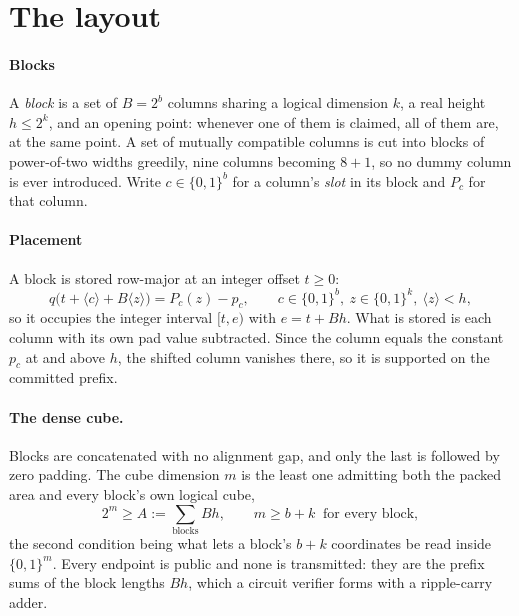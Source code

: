 \documentclass[11pt]{article}
\newcommand{\cube}[1]{\{0,1\}^{#1}}
\newcommand{\val}[1]{\langle #1 \rangle}
\theoremstyle{plain}
\begin{document}
\section{The layout}\label{sec:layout}

\paragraph{Blocks} A \emph{block} is a set of $B=2^b$ columns sharing a logical dimension $k$, a
real height $h\le2^k$, and an opening point: whenever one of them is claimed, all of them are,
at the same point. A set of mutually compatible columns is cut into blocks of power-of-two
widths greedily, nine columns becoming $8+1$, so no dummy column is ever introduced. Write
$c\in\cube b$ for a column's \emph{slot} in its block and $P_c$ for that column.

\paragraph{Placement} A block is stored row-major at an integer offset $t\ge0$:
\begin{equation}
  q\bigl(t+\val c+B\val z\bigr)=P_c(z)-p_c,\qquad c\in\cube b,\ z\in\cube k,\ \val z<h,
  \label{eq:place}
\end{equation}
so it occupies the integer interval $[t,e)$ with $e=t+Bh$. What is stored is each column with
its own pad value subtracted. Since the column equals the constant $p_c$ at and above $h$, the
shifted column vanishes there, so it is supported on the committed prefix.

\paragraph{The dense cube.} Blocks are concatenated with no alignment gap, and only the last
is followed by zero padding. The cube dimension $m$ is the least one admitting both the packed
area and every block's own logical cube,
\[
  2^m\ge A:=\sum_{\text{blocks}}Bh,\qquad m\ge b+k\ \text{ for every block},
\]
the second condition being what lets a block's $b+k$ coordinates be read inside $\cube m$.
Every endpoint is public and none is transmitted: they are the prefix sums of the block
lengths $Bh$, which a circuit verifier forms with a ripple-carry adder.

\end{document}
